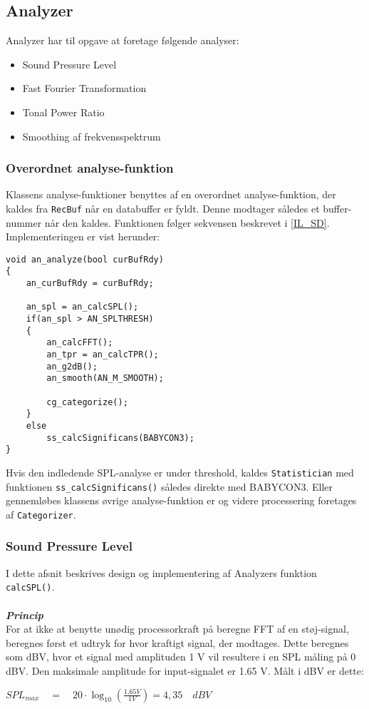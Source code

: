 \subsection{Analyzer}
Analyzer har til opgave at foretage følgende analyser:
\begin{itemize}
	\item Sound Pressure Level
	\item Fast Fourier Transformation
	\item Tonal Power Ratio
	\item Smoothing af frekvensspektrum
\end{itemize}

\subsubsection{Overordnet analyse-funktion}
Klassens analyse-funktioner benyttes af en overordnet analyse-funktion, der kaldes fra \verb+RecBuf+ når en databuffer er fyldt. Denne modtager således et buffer-nummer når den kaldes. Funktionen følger sekvensen beskrevet i \ref{IL_SD}. Implementeringen er vist herunder:
\begin{verbatim}void an_analyze(bool curBufRdy)
{
    an_curBufRdy = curBufRdy;

    an_spl = an_calcSPL();
    if(an_spl > AN_SPLTHRESH)
    {
        an_calcFFT();			
        an_tpr = an_calcTPR();
        an_g2dB();
        an_smooth(AN_M_SMOOTH);

        cg_categorize();
    }
    else
        ss_calcSignificans(BABYCON3);
}\end{verbatim}
Hvis den indledende SPL-analyse er under threshold, kaldes \verb+Statistician+ med funktionen \verb+ss_calcSignificans()+ således direkte med BABYCON3. Eller gennemløbes klassens øvrige analyse-funktion er og videre processering foretages af \verb+Categorizer+.

\subsubsection{Sound Pressure Level}
I dette afsnit beskrives design og implementering af Analyzers funktion \verb+calcSPL()+.\\ \\
\textbf{\textit{Princip}}\\
For at ikke at benytte unødig processorkraft på beregne FFT af en støj-signal, beregnes først et udtryk for hvor kraftigt signal, der modtages. Dette beregnes som dBV, hvor et signal med amplituden 1 V vil resultere i en SPL måling på 0 dBV. Den maksimale amplitude for input-signalet er 1.65 V. Målt i dBV er dette:
\begin{center}
${ SPL }_{ max }\quad =\quad 20\cdot \log _{ 10 }{ \left( \frac { 1.65V }{ 1V }  \right)  } =4,35\quad dBV$
\end{center}

